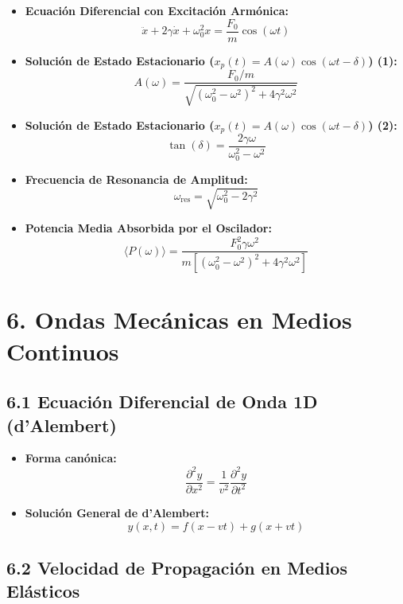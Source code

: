 \documentclass[11pt,a4paper]{article}
\begin{document}
\begin{itemize}
  \item \textbf{Ecuación Diferencial con Excitación Armónica:}
  \[
    \ddot{x} + 2\gamma \dot{x} + \omega_0^2 x = \frac{F_0}{m} \cos(\omega t)
  \]
  \item \textbf{Solución de Estado Estacionario ($x_p(t) = A(\omega) \cos(\omega t - \delta)$) (1):}
  \[
    A(\omega) = \frac{F_0 / m}{\sqrt{(\omega_0^2 - \omega^2)^2 + 4\gamma^2 \omega^2}}
  \]
  \item \textbf{Solución de Estado Estacionario ($x_p(t) = A(\omega) \cos(\omega t - \delta)$) (2):}
  \[
    \tan(\delta) = \frac{2\gamma \omega}{\omega_0^2 - \omega^2}
  \]
  \item \textbf{Frecuencia de Resonancia de Amplitud:}
  \[
    \omega_{\mathrm{res}} = \sqrt{\omega_0^2 - 2\gamma^2}
  \]
  \item \textbf{Potencia Media Absorbida por el Oscilador:}
  \[
    \langle P(\omega) \rangle = \frac{F_0^2 \gamma \omega^2}{m [(\omega_0^2 - \omega^2)^2 + 4\gamma^2 \omega^2]}
  \]
\end{itemize}

\section*{6. Ondas Mecánicas en Medios Continuos}

\subsection*{6.1 Ecuación Diferencial de Onda 1D (d'Alembert)}

\begin{itemize}
  \item \textbf{Forma canónica:}
  \[
    \frac{\partial^2 y}{\partial x^2} = \frac{1}{v^2} \frac{\partial^2 y}{\partial t^2}
  \]
  \item \textbf{Solución General de d'Alembert:}
  \[
    y(x, t) = f(x - vt) + g(x + vt)
  \]
\end{itemize}

\subsection*{6.2 Velocidad de Propagación en Medios Elásticos}
\end{document}
